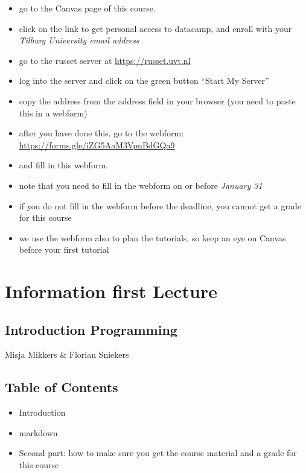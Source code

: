 \documentclass[]{book}
\providecommand{\tightlist}{%
  \setlength{\itemsep}{0pt}\setlength{\parskip}{0pt}}
\begin{document}
\begin{itemize}
\tightlist
\item
  go to the Canvas page of this course.
\item
  click on the link to get personal access to datacamp, and enroll with
  your \emph{Tilburg University email address}
\item
  go to the russet server at \url{https://russet.uvt.nl}
\item
  log into the server and click on the green button ``Start My Server''
\item
  copy the address from the address field in your browser (you need to
  paste this in a webform)
\item
  after you have done this, go to the webform:
  \url{https://forms.gle/iZG5AaM3VpnBdGQa9}
\item
  and fill in this webform.
\item
  note that you need to fill in the webform on or before \emph{January
  31}
\item
  if you do not fill in the webform before the deadline, you cannot get
  a grade for this course
\item
  we use the webform also to plan the tutorials, so keep an eye on
  Canvas before your first tutorial
\end{itemize}

\chapter{Information first Lecture}\label{information-first-lecture}

\section{Introduction Programming}\label{introduction-programming}

Misja Mikkers \& Florian Sniekers

\section{Table of Contents}\label{table-of-contents}

\begin{itemize}
\tightlist
\item
  Introduction
\item
  markdown
\item
  Second part: how to make sure you get the course material and a grade
  for this course
\end{itemize}
\end{document}
